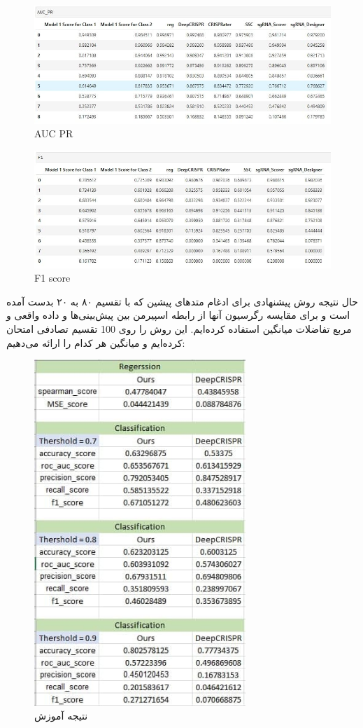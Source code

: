 \documentclass[12pt,a4paper,BCOR=.7cm,headsepline,bibliography=totoc]{report}
\begin{document}
\begin{figure}[H]
\centering
\includegraphics[width=15cm, ]{pictures/DeepCRISPR_PR.jpg}
\caption{
AUC PR
}\label{wrap-fig:4}
\end{figure}

\begin{figure}[H]
\centering
\includegraphics[width=15cm, ]{pictures/DeepCRISPR_F1.jpg}
\caption{
F1 score
}\label{wrap-fig:4}
\end{figure}


حال نتیجه روش‌ پیشنهادی برای ادغام متد‌های پیشین که با تقسیم ۸۰ به ۲۰ بدست آمده است و برای مقایسه رگرسیون آنها از رابطه اسپیرمن بین پیش‌بینی‌ها و داده واقعی و مربع تفاضلات میانگین استفاده کرده‌ایم. این روش را روی 100 تقسیم تصادفی امتحان کرده‌ایم و میانگین هر کدام را ارائه می‌دهیم:

\begin{figure}[H]
\centering
\includegraphics[width=8cm, ]{pictures/best_ensemble3.jpg}
\caption{
نتیجه آموزش
}\label{wrap-fig:4}
\end{figure}
\end{document}
